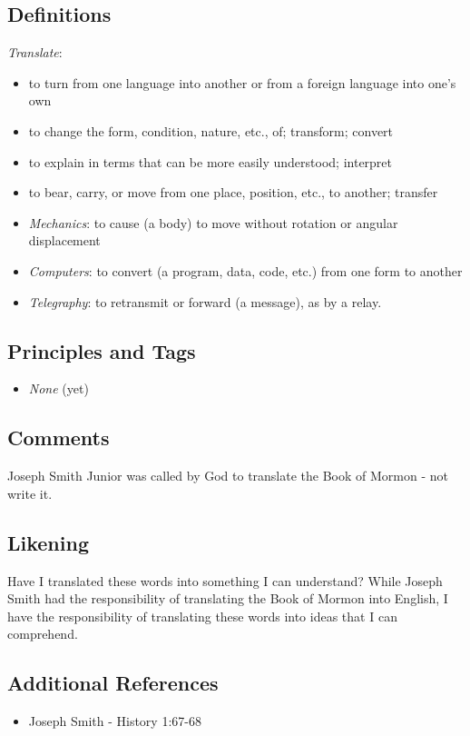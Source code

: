 \documentclass[12pt]{report}
\begin{document}
\subsection{Definitions\label{titlePage:DFN4}}
\emph{Translate}: \begin{itemize}
\item to turn from one language into another or from a foreign language into one's own
\item to change the form, condition, nature, etc., of; transform; convert
\item to explain in terms that can be more easily understood; interpret
\item to bear, carry, or move from one place, position, etc., to another; transfer
\item \emph{Mechanics}: to cause (a body) to move without rotation or angular displacement
\item \emph{Computers}: to convert (a program, data, code, etc.) from one form to another
\item \emph{Telegraphy}: to retransmit or forward (a message), as by a relay.
\end{itemize}
\subsection{Principles and Tags\label{titlePage:principles4}}
\begin{itemize}
\item \emph{None} (yet)
\end{itemize}

\subsection{Comments\label{titlePage:comments4}}
Joseph Smith Junior was called by God to translate the Book of Mormon - not write it.  

\subsection{Likening\label{titlePage:likening4}}
Have I translated these words into something I can understand?  While Joseph Smith had the responsibility of translating the Book of Mormon into English, I have the responsibility of translating these words into ideas that I can comprehend.

\subsection{Additional References\label{titlePage:references4}}
\begin{itemize}
\item Joseph Smith - History 1:67-68
\end{itemize}
\end{document}
